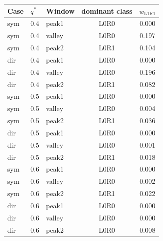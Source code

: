 \begin{tabular}{@{}lllc c@{}}
\toprule
Case & $q^*$ & Window & dominant class & $w_{\mathrm{L1R1}}$ \\
\midrule
sym & 0.4 & peak1 & L0R0 & 0.000 \\
sym & 0.4 & valley & L0R0 & 0.197 \\
sym & 0.4 & peak2 & L0R1 & 0.104 \\
dir & 0.4 & peak1 & L0R0 & 0.000 \\
dir & 0.4 & valley & L0R0 & 0.196 \\
dir & 0.4 & peak2 & L0R1 & 0.082 \\
sym & 0.5 & peak1 & L0R0 & 0.000 \\
sym & 0.5 & valley & L0R0 & 0.004 \\
sym & 0.5 & peak2 & L0R1 & 0.036 \\
dir & 0.5 & peak1 & L0R0 & 0.000 \\
dir & 0.5 & valley & L0R0 & 0.001 \\
dir & 0.5 & peak2 & L0R1 & 0.018 \\
sym & 0.6 & peak1 & L0R0 & 0.000 \\
sym & 0.6 & valley & L0R0 & 0.002 \\
sym & 0.6 & peak2 & L0R1 & 0.022 \\
dir & 0.6 & peak1 & L0R0 & 0.000 \\
dir & 0.6 & valley & L0R0 & 0.000 \\
dir & 0.6 & peak2 & L0R0 & 0.008 \\
\bottomrule
\end{tabular}
